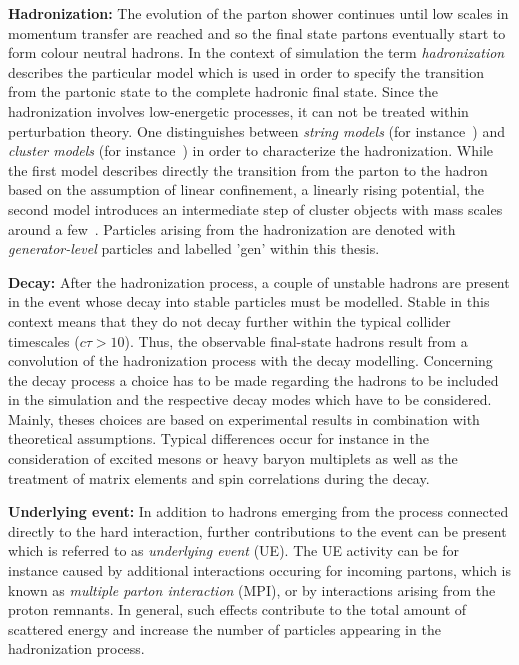\begin{description}
 \item \textbf{Hadronization:} The evolution of the parton shower continues until low scales in momentum transfer are reached and so the final state partons eventually start to form colour neutral hadrons. In the context of simulation the term \textit{hadronization} describes the particular model which is used in order to specify the transition from the partonic state to the complete hadronic final state. Since the hadronization involves low-energetic processes, it can not be treated within perturbation theory. One distinguishes between \textit{string models} (\cf for instance~\cite{Andersson198331}) and \textit{cluster models} (\cf for instance~\cite{Amati197987, Bassetto1979207}) in order to characterize the hadronization. While the first model describes directly the transition from the parton to the hadron based on the assumption of linear confinement, \ie a linearly rising potential, the second model introduces an intermediate step of cluster objects with mass scales around a few~\gev. Particles arising from the hadronization are denoted with \textit{generator-level} particles and labelled 'gen' within this thesis.
 \item \textbf{Decay:} After the hadronization process, a couple of unstable hadrons are present in the event whose decay into stable particles must be modelled. Stable in this context means that they do not decay further within the typical collider timescales ($c\tau > 10$\mm). Thus, the observable final-state hadrons result from a convolution of the hadronization process with the decay modelling. Concerning the decay process a choice has to be made regarding the hadrons to be included in the simulation and the respective decay modes which have to be considered. Mainly, theses choices are based on experimental results in combination with theoretical assumptions. Typical differences occur for instance in the consideration of excited mesons or heavy baryon multiplets as well as the treatment of matrix elements and spin correlations during the decay. 
 \item \textbf{Underlying event:} In addition to hadrons emerging from the process connected directly to the hard interaction, further contributions to the event can be present which is referred to as \textit{underlying event} (UE). The UE activity can be for instance caused by additional interactions occuring for incoming partons, which is known as \textit{multiple parton interaction} (MPI), or by interactions arising from the proton remnants. In general, such effects contribute to the total amount of scattered energy and increase the number of particles appearing in the hadronization process. 
\end{description}
